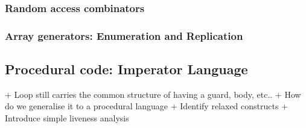 

\subsubsection{Random access combinators}



\subsubsection{Array generators: Enumeration and Replication}



\subsection{Procedural code: Imperator Language}

+ Loop still carries the common structure of having a guard, body, etc..
+ How do we generalise it to a procedural language
+ Identify relaxed constructs
+ Introduce simple liveness analysis


